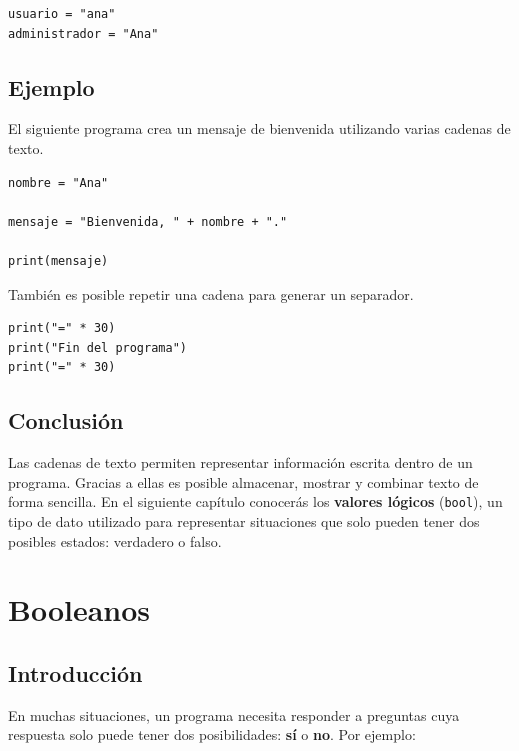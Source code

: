 \documentclass[11pt,a5paper,twoside]{book}
\begin{document}
\begin{tcolorbox}
\scriptsize
 \begin{verbatim}
usuario = "ana"
administrador = "Ana"
\end{verbatim}
\end{tcolorbox}
\subsection{Ejemplo}
El siguiente programa crea un mensaje de bienvenida utilizando varias cadenas de texto.


\begin{tcolorbox}
\scriptsize
 \begin{verbatim}
nombre = "Ana"

mensaje = "Bienvenida, " + nombre + "."

print(mensaje)
\end{verbatim}
\end{tcolorbox}
También es posible repetir una cadena para generar un separador.


\begin{tcolorbox}
\scriptsize
 \begin{verbatim}
print("=" * 30)
print("Fin del programa")
print("=" * 30)
\end{verbatim}
\end{tcolorbox}
\subsection{Conclusión}
Las cadenas de texto permiten representar información escrita dentro de un programa. Gracias a ellas es posible almacenar, mostrar y combinar texto de forma sencilla.
En el siguiente capítulo conocerás los \textbf{valores lógicos} ({\scriptsize \texttt{bool}}), un tipo de dato utilizado para representar situaciones que solo pueden tener dos posibles estados: verdadero o falso.

\newpage

\section{Booleanos}
\subsection{Introducción}
En muchas situaciones, un programa necesita responder a preguntas cuya respuesta solo puede tener dos posibilidades: \textbf{sí} o \textbf{no}.
Por ejemplo:
\end{document}
